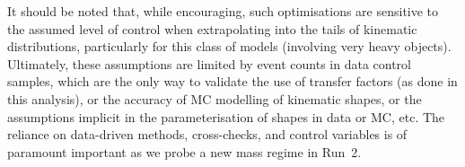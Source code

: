 It should be noted that, while encouraging, such optimisations are
sensitive to the assumed level of control when extrapolating into the
tails of kinematic distributions, particularly for this class of
models (involving very heavy objects). Ultimately, these assumptions
are limited by event counts in data control samples, which are the
only way to validate the use of transfer factors (as done in this
analysis), or the accuracy of MC modelling of kinematic shapes, or the
assumptions implicit in the parameterisation of shapes in data or MC,
etc. The reliance on data-driven methods, cross-checks, and control
variables is of paramount important as we probe a new mass regime in
Run~2.


